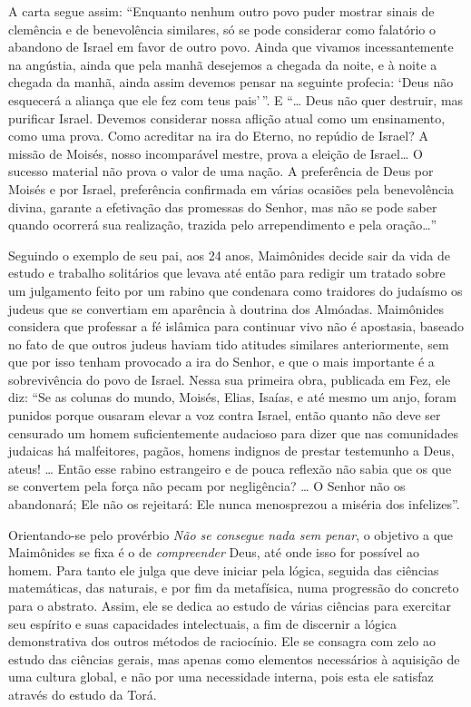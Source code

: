 A carta segue assim: ``Enquanto nenhum
outro povo puder mostrar sinais de clemência e de benevolência
similares, só se pode considerar como falatório o abandono de Israel em
favor de outro povo. Ainda que vivamos incessantemente na angústia,
ainda que pela manhã desejemos a chegada da noite, e à noite a chegada
da manhã, ainda assim devemos pensar na seguinte profecia: `Deus não
esquecerá a aliança que ele fez com teus pais'\,''. E ``\ldots{} Deus não 
quer destruir, mas purificar Israel. Devemos considerar nossa aflição atual 
como um ensinamento, como uma prova. Como acreditar na ira do Eterno, no 
repúdio de Israel? A missão de Moisés, nosso incomparável mestre, prova a 
eleição de Israel\ldots{} O sucesso material não prova o valor de uma nação. 
A preferência de Deus por Moisés e por Israel, preferência confirmada em 
várias ocasiões pela benevolência divina, garante a efetivação das promessas 
do Senhor, mas não se pode saber quando ocorrerá sua realização, trazida 
pelo arrependimento e pela oração\ldots{}''

Seguindo o exemplo de seu pai, aos 24 anos, Maimônides decide sair da
vida de estudo e trabalho solitários que levava até então para
redigir um tratado sobre um julgamento feito por um rabino que condenara
como traidores do judaísmo os judeus que se convertiam em aparência à
doutrina dos Almóadas. Maimônides considera que professar a fé
islâmica para continuar vivo não é apostasia, baseado no fato de que 
outros judeus haviam tido
atitudes similares anteriormente, sem que por isso tenham provocado a
ira do Senhor, e que o mais importante é a sobrevivência do povo de
Israel. Nessa sua primeira obra, publicada em Fez, ele diz: ``Se as
colunas do mundo, Moisés, Elias, Isaías, e até mesmo um anjo, foram
punidos porque ousaram elevar a voz contra Israel, então quanto não
deve ser censurado um homem suficientemente audacioso para dizer que
nas comunidades judaicas há malfeitores, pagãos, homens indignos de
prestar testemunho a Deus, ateus! \ldots{} Então esse rabino estrangeiro e de
pouca reflexão não sabia que os que se convertem pela força não pecam
por negligência? \ldots{} O Senhor não os abandonará; Ele não os rejeitará:
Ele nunca menosprezou a miséria dos infelizes''.

Orientando-se pelo provérbio \emph{Não se consegue nada sem penar}, o
objetivo a que Maimônides se fixa é o de \emph{compreender} Deus, até onde
isso for possível ao homem. Para tanto ele julga que deve iniciar pela
lógica, seguida das ciências matemáticas, das naturais, e por fim da
metafísica, numa progressão do concreto para o abstrato. Assim, ele se
dedica ao estudo de várias ciências para exercitar seu espírito e suas
capacidades intelectuais, a fim de discernir a lógica demonstrativa dos
outros métodos de raciocínio. Ele se consagra com zelo ao estudo das
ciências gerais, mas apenas como elementos necessários à aquisição de
uma cultura global, e não por uma necessidade interna, pois esta ele
satisfaz através do estudo da Torá.

